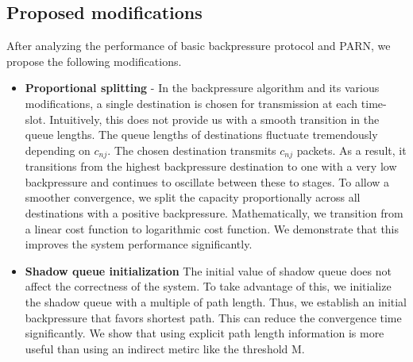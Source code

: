 \subsection{Proposed modifications}
After analyzing the performance of basic backpressure protocol and PARN, we propose the following modifications.
\begin{itemize}
\item \textbf{Proportional splitting} - In the backpressure algorithm and its various modifications, a single destination is chosen for transmission at each time-slot. Intuitively, this does not provide us with a smooth transition in the queue lengths. The queue lengths of destinations fluctuate tremendously depending on $c_{nj}$. The chosen destination transmits $c_{nj}$ packets. As a result, it transitions from the highest backpressure destination to one with a very low backpressure and continues to oscillate between these to stages. To allow a smoother convergence, we split the capacity proportionally across all destinations with a positive backpressure. Mathematically, we transition from a linear cost function to logarithmic cost function. We demonstrate that this improves the system performance significantly.
   
\item \textbf{Shadow queue initialization}  The initial value of shadow queue does not affect the correctness of the system. To take advantage of this, we initialize the shadow queue with a multiple of path length. Thus, we establish an initial backpressure that favors shortest path. This can reduce the convergence time significantly. We show that using explicit path length information is more useful than using an indirect metirc like the threshold M.

\end{itemize}
 